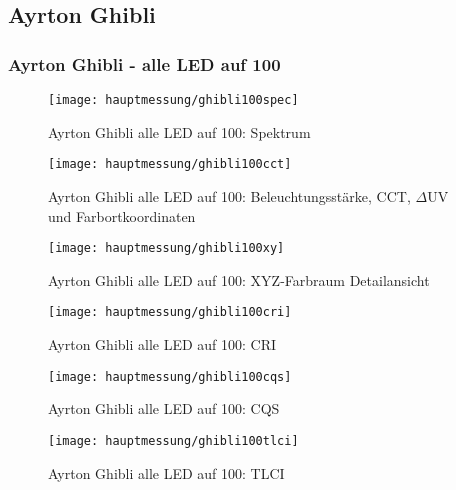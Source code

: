 \documentclass[pagesize,paper=A4,fontsize=12pt,utf8,numbers=noenddot,bibliography=totoc,listof=totoc,DIV=11,BCOR=1mm]{scrreprt}
\begin{document}
\subsection{Ayrton Ghibli}

\subsubsection{Ayrton Ghibli - alle LED auf 100}

\begin{figure}[htp]     %
\centering
\texttt{[image: hauptmessung/ghibli100spec]} 
\caption {Ayrton Ghibli alle LED auf 100: Spektrum} 
\end{figure}

\begin{figure}[htp]     %
\centering
\texttt{[image: hauptmessung/ghibli100cct]} 
\caption {Ayrton Ghibli alle LED auf 100: Beleuchtungsstärke, CCT, $\Delta$UV und Farbortkoordinaten} 
\end{figure}

\begin{figure}[htp]     %
\centering
\texttt{[image: hauptmessung/ghibli100xy]} 
\caption {Ayrton Ghibli alle LED auf 100: XYZ-Farbraum Detailansicht} 
\end{figure}

\begin{figure}[htp]     %
\centering
\texttt{[image: hauptmessung/ghibli100cri]} 
\caption {Ayrton Ghibli alle LED auf 100: CRI} 
\end{figure}

\begin{figure}[htp]     %
\centering
\texttt{[image: hauptmessung/ghibli100cqs]} 
\caption {Ayrton Ghibli alle LED auf 100: CQS} 
\end{figure}

\begin{figure}[htp]     %
\centering
\texttt{[image: hauptmessung/ghibli100tlci]} 
\caption {Ayrton Ghibli alle LED auf 100: TLCI} 
\end{figure}
\end{document}
